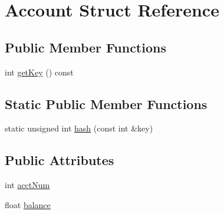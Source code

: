 \hypertarget{struct_account}{\section{Account Struct Reference}
\label{struct_account}
}
\subsection*{Public Member Functions}
\begin{DoxyCompactItemize}
\item 
int \hyperlink{struct_account_a799fdb1580f800ef7fba220c0dfa9ed9}{get\-Key} () const 
\end{DoxyCompactItemize}
\subsection*{Static Public Member Functions}
\begin{DoxyCompactItemize}
\item 
static unsigned int \hyperlink{struct_account_a05ec48bb7b69a8e39a2f66077fb5f0e5}{hash} (const int \&key)
\end{DoxyCompactItemize}
\subsection*{Public Attributes}
\begin{DoxyCompactItemize}
\item 
int \hyperlink{struct_account_a28c251b009a021f846b5c1a612142c3a}{acct\-Num}
\item 
float \hyperlink{struct_account_a3acb87e14fe08776a714037637f248f7}{balance}
\end{DoxyCompactItemize}


